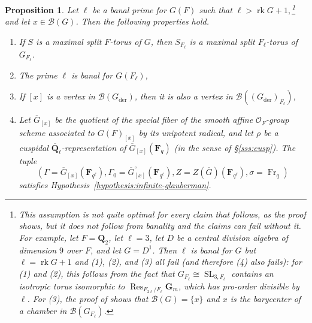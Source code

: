 \documentclass[reqno]{amsart}
\numberwithin{equation}{subsection}
\newcommand{\F}{\mathbf{F}}
\newcommand{\G}{\mathbf{G}}
\newcommand{\Q}{\mathbf{Q}}
\newcommand{\ol}[1]{\overline{#1}}
\newcommand\cB{\mathcal{B}}
\newcommand\cO{\mathcal{O}}
\DeclareMathOperator{\SL}{SL}
\DeclareMathOperator{\Res}{Res}
\DeclareMathOperator{\der}{der}
\DeclareMathOperator{\rk}{rk}
\DeclareMathOperator{\Fr}{Fr}
\newtheorem{prop}[thm]{Proposition}
\theoremstyle{remark}
\numberwithin{equation}{subsection}
\numberwithin{figure}{subsection}
\begin{document}
\begin{prop}\label{prop:banal-primes}
    Let $\ell$ be a banal prime for $G(F)$ such that $\ell > \rk G+1,$\footnote{This assumption is not quite optimal for every claim that follows, as the proof shows, but it does not follow from banality and the claims can fail without it. For example, let $F = \Q_2$, let $\ell = 3$, let $D$ be a central division algebra of dimension $9$ over $F$, and let $G = D^1$. Then $\ell$ is banal for $G$ but $\ell = \rk G + 1$ and (1), (2), and (3) all fail (and therefore (4) also fails): for (1) and (2), this follows from the fact that $G_{F_\ell} \cong \SL_{3, F_\ell}$ contains an isotropic torus isomorphic to $\Res_{F_{2\ell}/F_\ell} \G_m$, which has pro-order divisible by $\ell$. For (3), the proof of \cite[Theorem~10.3.1]{KP} shows that $\cB(G) = \{x\}$ and $x$ is the barycenter of a chamber in $\cB(G_{F_\ell})$.} and let $x \in \cB(G)$. Then the following properties hold. 
    \begin{enumerate}
        \item If $S$ is a maximal split $F$-torus of $G$, then $S_{F_\ell}$ is a maximal split $F_\ell$-torus of $G_{F_\ell}$.
        \item The prime $\ell$ is banal for $G(F_\ell)$,
        \item If $[x]$ is a vertex in $\cB(G_{\der})$, then it is also a vertex in $\cB((G_{\der})_{F_\ell})$,
        \item Let $\ol G_{[x]}$ be the quotient of the special fiber of the smooth affine $\cO_F$-group scheme associated to $G(F)_{[x]}$ by its unipotent radical, and let $\rho$ be a cuspidal $\ol\Q_\ell$-representation of $\ol G_{[x]}(\F_q)$ (in the sense of \S\ref{sss:cusp}). The tuple 
        \[
        (\Gamma = \ol G_{[x]}(\F_{q^\ell}), \Gamma_0 = \ol G_{[x]}^\circ(\F_{q^\ell}), Z = Z(\ol G)(\F_{q^\ell}),\sigma = \Fr_q)
        \]
        satisfies Hypothesis~\ref{hypothesis:infinite-glauberman}.
    \end{enumerate}
\end{prop}
\end{document}
